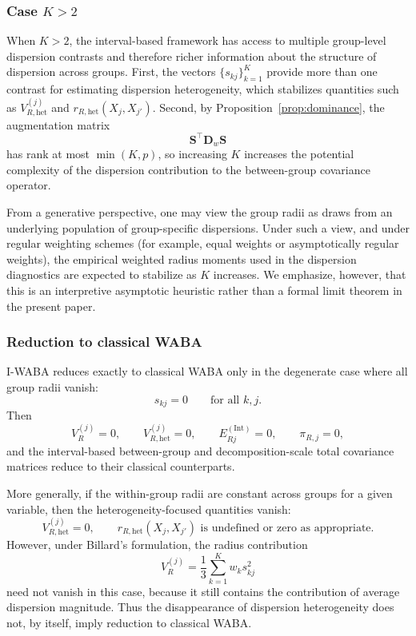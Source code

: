 \documentclass[preprint, times, 12pt, authoryear]{elsarticle}
\begin{document}
 \subsubsection{Case $K>2$}
 
 When $K>2$, the interval-based framework has access to multiple group-level dispersion contrasts and therefore richer information about the structure of dispersion across groups. First, the vectors $\{s_{kj}\}_{k=1}^K$ provide more than one contrast for estimating dispersion heterogeneity, which stabilizes quantities such as $V_{R,\mathrm{het}}^{(j)}$ and $r_{R,\mathrm{het}}(X_j,X_{j'})$. Second, by Proposition~\ref{prop:dominance}, the augmentation matrix
 \[
 \mathbf S^\top \mathbf D_w \mathbf S
 \]
 has rank at most $\min(K,p)$, so increasing $K$ increases the potential complexity of the dispersion contribution to the between-group covariance operator.
 
 From a generative perspective, one may view the group radii as draws from an underlying population of group-specific dispersions. Under such a view, and under regular weighting schemes (for example, equal weights or asymptotically regular weights), the empirical weighted radius moments used in the dispersion diagnostics are expected to stabilize as $K$ increases. We emphasize, however, that this is an interpretive asymptotic heuristic rather than a formal limit theorem in the present paper.
 
 \subsubsection{Reduction to classical WABA}
 
 I-WABA reduces exactly to classical WABA only in the degenerate case where all group radii vanish:
 \[
 s_{kj}=0 \qquad \text{for all } k,j.
 \]
 Then
 \[
 V_R^{(j)}=0,
 \qquad
 V_{R,\mathrm{het}}^{(j)}=0,
 \qquad
 E_{Rj}^{(\mathrm{Int})}=0,
 \qquad
 \pi_{R,j}=0,
 \]
 and the interval-based between-group and decomposition-scale total covariance matrices reduce to their classical counterparts.
 
 More generally, if the within-group radii are constant across groups for a given variable, then the heterogeneity-focused quantities vanish:
 \[
 V_{R,\mathrm{het}}^{(j)}=0,
 \qquad
 r_{R,\mathrm{het}}(X_j,X_{j'}) \text{ is undefined or zero as appropriate}.
 \]
 However, under Billard's formulation, the radius contribution
 \[
 V_R^{(j)}=\frac13\sum_{k=1}^K w_k s_{kj}^2
 \]
 need not vanish in this case, because it still contains the contribution of average dispersion magnitude. Thus the disappearance of dispersion heterogeneity does not, by itself, imply reduction to classical WABA.
 
\end{document}
